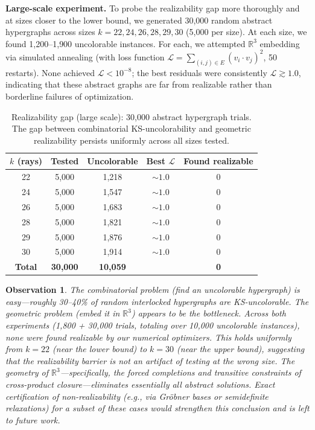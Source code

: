 \documentclass[12pt,a4paper]{article}
\newtheorem{observation}[theorem]{Observation}
\newcommand{\R}{\mathbb{R}}
\begin{document}
\textbf{Large-scale experiment.} To probe the realizability gap more thoroughly and at sizes closer to the lower bound, we generated 30{,}000 random abstract hypergraphs across sizes $k = 22, 24, 26, 28, 29, 30$ (5{,}000 per size). At each size, we found 1{,}200--1{,}900 uncolorable instances. For each, we attempted $\R^3$ embedding via simulated annealing (with loss function $\mathcal{L} = \sum_{(i,j)\in E}(v_i \cdot v_j)^2$, 50 restarts). None achieved $\mathcal{L} < 10^{-8}$; the best residuals were consistently $\mathcal{L} \gtrsim 1.0$, indicating that these abstract graphs are far from realizable rather than borderline failures of optimization.

\begin{table}[ht]
\centering
\caption{Realizability gap (large scale): 30{,}000 abstract hypergraph trials. The gap between combinatorial KS-uncolorability and geometric realizability persists uniformly across all sizes tested.}
\label{tab:realizability-large}
\begin{tabular}{ccccc}
\toprule
$k$ (rays) & Tested & Uncolorable & Best $\mathcal{L}$ & Found realizable \\
\midrule
22 & 5{,}000 & 1{,}218 & $\sim 1.0$ & 0 \\
24 & 5{,}000 & 1{,}547 & $\sim 1.0$ & 0 \\
26 & 5{,}000 & 1{,}683 & $\sim 1.0$ & 0 \\
28 & 5{,}000 & 1{,}821 & $\sim 1.0$ & 0 \\
29 & 5{,}000 & 1{,}876 & $\sim 1.0$ & 0 \\
30 & 5{,}000 & 1{,}914 & $\sim 1.0$ & 0 \\
\midrule
\textbf{Total} & \textbf{30{,}000} & \textbf{10{,}059} & & \textbf{0} \\
\bottomrule
\end{tabular}
\end{table}

\begin{observation}\label{obs:gap}
The combinatorial problem (find an uncolorable hypergraph) is easy---roughly 30--40\% of random interlocked hypergraphs are KS-uncolorable. The geometric problem (embed it in $\R^3$) appears to be the bottleneck. Across both experiments (1{,}800 + 30{,}000 trials, totaling over 10{,}000 uncolorable instances), none were found realizable by our numerical optimizers. This holds uniformly from $k=22$ (near the lower bound) to $k=30$ (near the upper bound), suggesting that the realizability barrier is not an artifact of testing at the wrong size. The geometry of $\R^3$---specifically, the forced completions and transitive constraints of cross-product closure---eliminates essentially all abstract solutions. Exact certification of non-realizability (e.g., via Gr\"obner bases or semidefinite relaxations) for a subset of these cases would strengthen this conclusion and is left to future work.
\end{observation}
\end{document}
